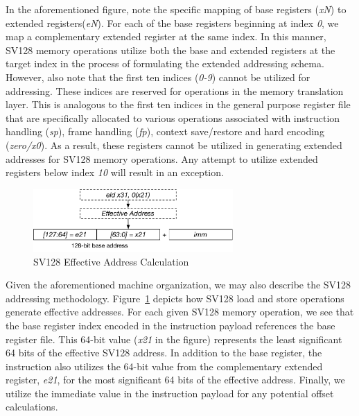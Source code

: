 \documentclass{article}
\begin{document}
In the aforementioned figure, note the specific mapping of base registers 
(\textit{xN}) to extended registers(\textit{eN}).  For each of the base 
registers beginning at index \textit{0}, we map a complementary extended 
register at the same index.  In this manner, SV128 memory operations 
utilize both the base and extended registers at the target index in the process 
of formulating the extended addressing schema.  However, also note that 
the first ten indices (\textit{0-9}) cannot be utilized for addressing.  These 
indices are reserved for operations in the memory translation layer.  This is 
analogous to the first ten indices in the general purpose register file 
that are specifically allocated to various operations associated with instruction 
handling (\textit{sp}), frame handling (\textit{fp}), context save/restore 
and hard encoding (\textit{zero/x0}).  As a result, these registers cannot be 
utilized in generating extended addresses for SV128 memory operations.  
Any attempt to utilize extended registers below index \textit{10} will 
result in an exception.    

\begin{figure}[h!]
\begin{center}
\includegraphics[width=3in]{figures/effectiveaddress.pdf}
\caption{SV128 Effective Address Calculation}
\label{fig:effectiveaddr}
\end{center}
\end{figure}

Given the aforementioned machine organization, we may also describe the SV128 addressing methodology.  
Figure~\ref{fig:effectiveaddr} depicts how SV128 load and store operations generate effective addresses.  For each 
given SV128 memory operation, we see that the base register index encoded in the instruction payload references 
the base register file.  This 64-bit value (\textit{x21} in the figure) represents the least significant 64 bits of the effective 
SV128 address.  In addition to the base register, the instruction also utilizes the 64-bit value from the complementary 
extended register, \textit{e21}, for the most significant 64 bits of the effective address.  Finally, we utilize the immediate 
value in the instruction payload for any potential offset calculations.
\end{document}
